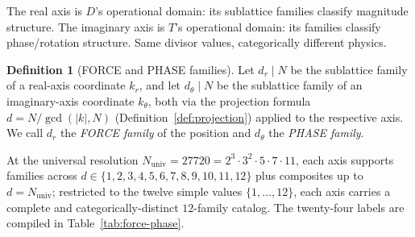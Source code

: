 \documentclass[11pt,a4paper]{article}
\theoremstyle{definition}
\newtheorem{definition}[theorem]{Definition}
\theoremstyle{remark}
\begin{document}
The real axis is $D$'s operational domain: its sublattice families classify magnitude structure. The imaginary axis is $T$'s operational domain: its families classify phase/rotation structure. Same divisor values, categorically different physics.

\begin{definition}[FORCE and PHASE families]\label{def:force-phase}
Let $d_{r} \mid N$ be the sublattice family of a real-axis coordinate $k_{r}$, and let $d_{\theta} \mid N$ be the sublattice family of an imaginary-axis coordinate $k_{\theta}$, both via the projection formula $d = N/\gcd(|k|,N)$ (Definition~\ref{def:projection}) applied to the respective axis. We call $d_{r}$ the \emph{FORCE family} of the position and $d_{\theta}$ the \emph{PHASE family}.
\end{definition}

At the universal resolution $N_{\text{univ}} = 27720 = 2^{3}\cdot 3^{2}\cdot 5\cdot 7\cdot 11$, each axis supports families across $d\in\{1,2,3,4,5,6,7,8,9,10,11,12\}$ plus composites up to $d=N_{\text{univ}}$; restricted to the twelve simple values $\{1,\ldots,12\}$, each axis carries a complete and categorically-distinct $12$-family catalog. The twenty-four labels are compiled in Table~\ref{tab:force-phase}.
\end{document}
